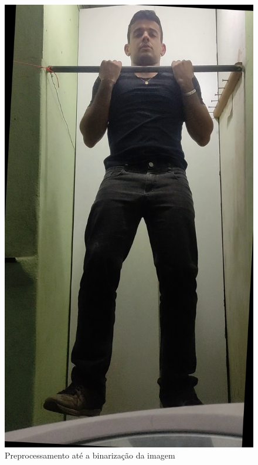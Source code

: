 \renewcommand{\sizeImg}{0.2}
\begin{figure}[H]
    \caption{Preprocessamento até a binarização da imagem}
    \centering
        \begin{minipage}{\sizeImg\textwidth}
            \includegraphics[width=\textwidth]{figuras/ultrapassar_barra/134_original.png}
        \end{minipage}
        \begin{minipage}{\sizeImg\textwidth}

\end{minipage}
\end{figure}
